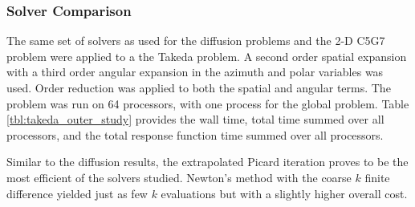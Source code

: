 \subsubsection{Solver Comparison}

The same set of solvers as used for the diffusion problems 
and the 2-D C5G7 problem were applied to a the Takeda problem. A second 
order spatial expansion with a third order angular expansion in the 
azimuth and polar variables was used.  Order reduction was applied to both 
the spatial and angular terms.  The problem was run on 64 processors, with 
one process for the global problem.  Table \ref{tbl:takeda_outer_study} 
provides the wall time, total time summed over all processors, and the 
total response function time summed over all processors.  

Similar to the diffusion results, the extrapolated Picard iteration 
proves to be the most efficient of the solvers studied.  
Newton's method with the coarse $k$ finite difference yielded just as 
few $k$ evaluations but with a slightly higher overall cost.

